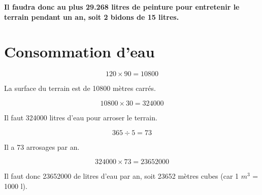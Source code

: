 \documentclass[12pt,a4paper]{article}
\begin{document}
\textbf{Il faudra donc au plus \num{29.268} litres de peinture pour entretenir le terrain pendant un an, soit 2 bidons de 15 litres.
}

\section{Consommation d'eau}

\begin{equation*}
	120 \times 90 = \num{10800}
\end{equation*}

La surface du terrain est de \num{10800} mètres carrés.


\begin{equation*}
	\num{10800} \times 30 = \num{324000}
\end{equation*}

Il faut \num{324000} litres d'eau pour arroser le terrain.

\begin{equation*}
	365 \div 5 = 73
\end{equation*}

Il a 73 arrosages par an.

\begin{equation*}
	\num{324000} \times 73 = \num{23652000}
\end{equation*}

Il faut donc \num{23652000} de litres d'eau par an, soit \num{23652} mètres cubes (car 1 $m^3$ = 1000 l).
\end{document}
